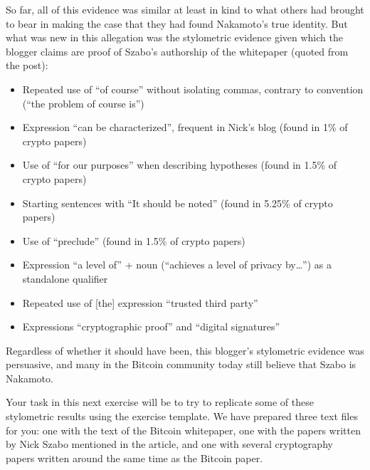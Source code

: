 \documentclass{article}
\begin{document}
So far, all of this evidence was similar at least in kind to what others had brought to bear in making the case that they had found Nakamoto's true identity. But what was new in this allegation was the stylometric evidence given which the blogger claims are proof of Szabo's authorship of the whitepaper (quoted from the post):

\begin{itemize}
    \item Repeated use of ``of course'' without isolating commas, contrary to convention (``the problem of course is'')
    \item Expression ``can be characterized'', frequent in Nick’s blog (found in 1\% of crypto papers)
    \item Use of ``for our purposes'' when describing hypotheses (found in 1.5\% of crypto papers)
    \item Starting sentences with ``It should be noted'' (found in 5.25\% of crypto papers)
    \item Use of ``preclude'' (found in 1.5\% of crypto papers)
    \item Expression ``a level of'' + noun  (``achieves a level of privacy by…'') as a standalone qualifier
    \item Repeated use of [the] expression ``trusted third party''
    \item Expressions ``cryptographic proof'' and ``digital signatures''
\end{itemize}

\noindent Regardless of whether it should have been, this blogger's stylometric evidence was persuasive, and many in the Bitcoin community today still believe that Szabo is Nakamoto.

Your task in this next exercise will be to try to replicate some of these stylometric results using the exercise template. We have prepared three text files for you: one with the text of the Bitcoin whitepaper, one with the papers written by Nick Szabo mentioned in the article, and one with several cryptography papers written around the same time as the Bitcoin paper.
\end{document}
